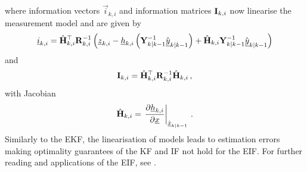 where information vectors $\vec{i}_{k,i}$ and information matrices ${{\mathbf{I}}}_{k,i}$ now linearise the measurement model and are given by
\begin{equation}\label{eq:prelims:eif_measurement_vec_defn}
    {\underline{i}}_{k,i} = \hat{{{\mathbf{H}}}}_{k,i}^\top{\ensuremath{{\mathbf{R}}}}_{k,i}^{-1}\left({\underline{z}}_{k,i} - {\underline{h}}_{k,i}\left({{\mathbf{Y}}}_{k|k-1}^{-1}\hat{{\underline{y}}}_{k|k-1}\right) + \hat{{{\mathbf{H}}}}_{k,i}{{\mathbf{Y}}}_{k|k-1}^{-1}\hat{{\underline{y}}}_{k|k-1}\right)
\end{equation}
and
\begin{equation}\label{eq:prelims:eif_measurement_mat_defn}
    {\ensuremath{{\mathbf{I}}}}_{k,i} = \hat{{{\mathbf{H}}}}_{k,i}^\top{\ensuremath{{\mathbf{R}}}}_{k,i}^{-1}\hat{{{\mathbf{H}}}}_{k,i}\,,
\end{equation}
with Jacobian
\begin{equation}
    \hat{{{\mathbf{H}}}}_{k,i} = \left.\frac{\partial {\underline{h}}_{k,i}}{\partial {\underline{x}}}\right|_{\hat{{\underline{x}}}_{k|k-1}}\,.
\end{equation}
Similarly to the EKF, the linearisation of models leads to estimation errors making optimality guarantees of the KF and IF not hold for the EIF. For further reading and applications of the EIF, see \cite[Chap. 2]{mutambaraDecentralizedEstimationControl1998}.

% 
% 

